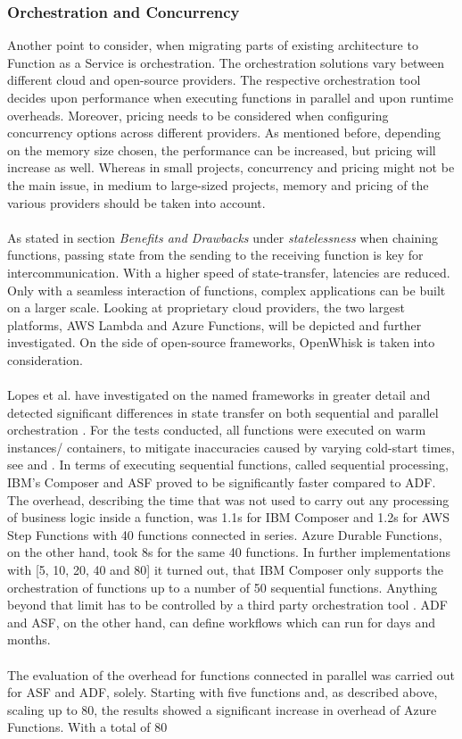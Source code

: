 \documentclass[11pt]{article}
\begin{document}
\subsubsection{Orchestration and Concurrency}
 Another point to consider, when migrating parts of existing architecture to Function as a Service is orchestration. The orchestration solutions vary between different cloud and open-source providers. The respective orchestration tool decides upon performance when executing functions in parallel and upon runtime overheads. Moreover, pricing needs to be considered when configuring concurrency options across different providers. As mentioned before, depending on the memory size chosen, the performance can be increased, but pricing will increase as well. Whereas in small projects, concurrency and pricing might not be the main issue, in medium to large-sized projects, memory and pricing of the various providers should be taken into account.\\\\ As stated in section \textit{Benefits and Drawbacks} under \textit{statelessness} when chaining functions, passing state from the sending to the receiving function is key for intercommunication. With a higher speed of state-transfer, latencies are reduced. Only with a seamless interaction of functions, complex applications can be built on a larger scale. Looking at proprietary cloud providers, the two largest platforms, AWS Lambda and Azure Functions,  will be depicted and further investigated. On the side of open-source frameworks, OpenWhisk is taken into consideration.\\\\ Lopes et al. have investigated on the named frameworks in greater detail and detected significant differences in state transfer on both sequential and parallel orchestration \cite{lopez2018comparison}. For the tests conducted, all functions were executed on warm instances/ containers, to mitigate inaccuracies caused by varying cold-start times, see \cite{manner2018cold} and \cite{jackson2018investigation}. In terms of executing sequential functions, called sequential processing, IBM's Composer and ASF proved to be significantly faster compared to ADF. The overhead, describing the time that was not used to carry out any processing of business logic inside a function, was 1.1s for IBM Composer and 1.2s for AWS Step Functions with 40 functions connected in series. Azure Durable Functions, on the other hand, took 8s for the same 40 functions. In further implementations with [5, 10, 20, 40 and 80] it turned out, that IBM Composer only supports the orchestration of functions up to a number of 50 sequential functions. Anything beyond that limit has to be controlled by a third party orchestration tool \cite{lopez2018comparison}. ADF and ASF, on the other hand, can define workflows which can run for days and months.\\\\ The evaluation of the overhead for functions connected in parallel was carried out for ASF and ADF, solely. Starting with five functions and, as described above, scaling up to 80, the results showed a significant increase in overhead of Azure Functions. With a total of 80 
\end{document}
